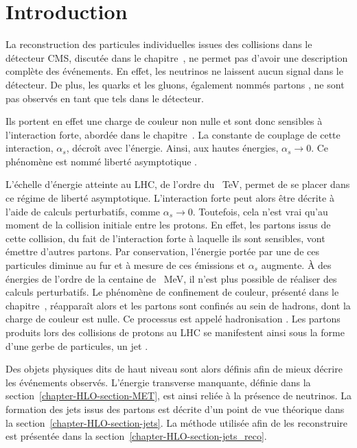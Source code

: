 \section{Introduction}\label{chapter-HLO-section-introduction}
La reconstruction des particules individuelles issues des collisions dans le détecteur CMS, discutée dans le chapitre~, ne permet pas d'avoir une description complète des événements.
En effet, les neutrinos ne laissent aucun signal dans le détecteur.
De plus, les quarks et les gluons, également nommés \og partons \fg, ne sont pas observés en tant que tels dans le détecteur.
\par
Ils portent en effet une charge de couleur non nulle et sont donc sensibles à l'interaction forte, abordée dans le chapitre~.
La constante de couplage de cette interaction, $\alpha_s$, décroît avec l'énergie.
Ainsi, aux hautes énergies, $\alpha_s \to 0$.
Ce phénomène est nommé \og liberté asymptotique \fg.
\par
L'échelle d'énergie atteinte au LHC, de l'ordre du \SI{}{\TeV}, permet de se placer dans ce régime de liberté asymptotique.
L'interaction forte peut alors être décrite à l'aide de calculs perturbatifs, comme $\alpha_s \to 0$.
Toutefois, cela n'est vrai qu'au moment de la collision initiale entre les protons.
En effet, les partons issus de cette collision, du fait de l'interaction forte à laquelle ils sont sensibles, vont émettre d'autres partons.
Par conservation, l'énergie portée par une de ces particules diminue au fur et à mesure de ces émissions et $\alpha_s$ augmente.
À des énergies de l'ordre de la centaine de \SI{}{\MeV}, il n'est plus possible de réaliser des calculs perturbatifs.
Le phénomène de confinement de couleur, présenté dans le chapitre~, réapparaît alors et les partons sont confinés au sein de hadrons, dont la charge de couleur est nulle.
Ce processus est appelé \og hadronisation \fg.
Les partons produits lors des collisions de protons au LHC se manifestent ainsi sous la forme d'une gerbe de particules, un \og jet \fg.
\par
Des objets physiques dits de \og haut niveau \fg{} sont alors définis afin de mieux décrire les événements observés.
L'énergie transverse manquante, définie dans la section~\ref{chapter-HLO-section-MET}, est ainsi reliée à la présence de neutrinos.
La formation des jets issus des partons est décrite d'un point de vue théorique dans la section~\ref{chapter-HLO-section-jets}.
La méthode utilisée afin de les reconstruire est présentée dans la section~\ref{chapter-HLO-section-jets_reco}.
